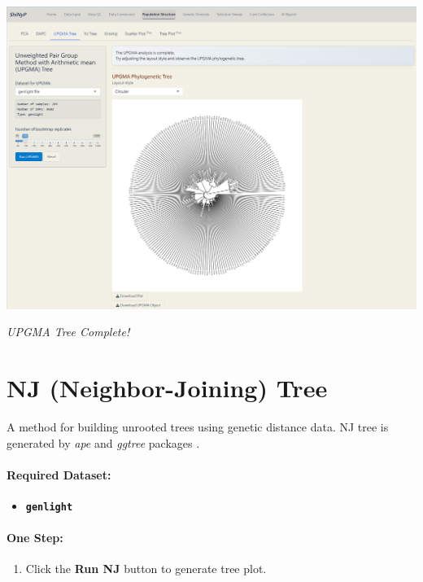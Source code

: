 \documentclass[
]{book}
\providecommand{\tightlist}{%
  \setlength{\itemsep}{0pt}\setlength{\parskip}{0pt}}
\begin{document}
\includegraphics{images/clipboard-3531175086.png}

\emph{UPGMA Tree Complete!}

\section{NJ (Neighbor-Joining) Tree}\label{nj-neighbor-joining-tree}

A method for building unrooted trees using genetic distance data. NJ tree is generated by \emph{ape} and \emph{ggtree} packages \citep{paradis2018, yu2016}.

\paragraph*{Required Dataset:}\label{required-dataset-4}

\begin{itemize}
\tightlist
\item
  {\textbf{\texttt{genlight}}}
\end{itemize}

\paragraph*{\texorpdfstring{\textbf{One Step:}}{One Step:}}\label{one-step-2}

\begin{enumerate}
\def\labelenumi{\arabic{enumi}.}
\tightlist
\item
  Click the {\textbf{Run NJ}} button to generate tree plot.
\end{enumerate}
\end{document}
